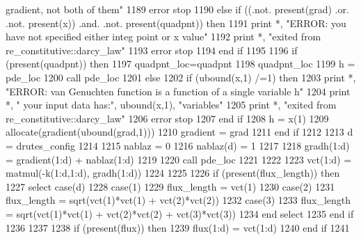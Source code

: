 \begin{DoxyCode}
{       gradient, not both of them"}
1189         error stop
1190       \textcolor{keywordflow}{else} \textcolor{keywordflow}{if} ((.not. \textcolor{keyword}{present}(grad) .or. .not. \textcolor{keyword}{present}(x)) .and. .not. \textcolor{keyword}{present}\textcolor{comment}{(quadpnt)) }\textcolor{keywordflow}{then}
1191         print *, \textcolor{stringliteral}{"ERROR: you have not specified either integ point or x value"}
1192         print *, \textcolor{stringliteral}{"exited from re\_constitutive::darcy\_law"}
1193         error stop
1194 \textcolor{keywordflow}{      end if}
1195       
1196       \textcolor{keywordflow}{if} (\textcolor{keyword}{present}(quadpnt)) \textcolor{keywordflow}{then}
1197         quadpnt\_loc=quadpnt
1198         quadpnt\_loc%
1199         h = pde\_loc%
1200         \textcolor{keyword}{call }pde\_loc%
1201       \textcolor{keywordflow}{else}
1202         \textcolor{keywordflow}{if} (ubound(x,1) /=1) \textcolor{keywordflow}{then}
1203           print *, \textcolor{stringliteral}{"ERROR: van Genuchten function is a function of a single variable h"}
1204           print *, \textcolor{stringliteral}{"       your input data has:"}, ubound(x,1), \textcolor{stringliteral}{"variables"}
1205           print *, \textcolor{stringliteral}{"exited from re\_constitutive::darcy\_law"}
1206           error stop
1207 \textcolor{keywordflow}{        end if}
1208         h = x(1)
1209         \textcolor{keyword}{allocate}(gradient(ubound(grad,1)))
1210         gradient = grad
1211 \textcolor{keywordflow}{      end if}
1212       
1213       d = drutes_config%
1214 
1215       nablaz = 0
1216       nablaz(d) = 1
1217       
1218       gradh(1:d) = gradient(1:d) + nablaz(1:d)
1219 
1220       \textcolor{keyword}{call }pde\_loc%
1221 \textcolor{comment}{     }
1222 \textcolor{comment}{      }
1223 \textcolor{comment}{      vct(1:d) = matmul(-k(1:d,1:d), gradh(1:d))}
1224 \textcolor{comment}{}
1225 \textcolor{comment}{}
1226 \textcolor{comment}{      }\textcolor{keywordflow}{if} (\textcolor{keyword}{present}(flux\_length)) \textcolor{keywordflow}{then}
1227         \textcolor{keywordflow}{select case}(d)
1228           \textcolor{keywordflow}{case}(1)
1229                 flux\_length = vct(1)
1230           \textcolor{keywordflow}{case}(2)
1231                 flux\_length = sqrt(vct(1)*vct(1) + vct(2)*vct(2))
1232           \textcolor{keywordflow}{case}(3)
1233                 flux\_length = sqrt(vct(1)*vct(1) + vct(2)*vct(2) + vct(3\textcolor{comment}{)*vct(3))}
1234 \textcolor{comment}{}\textcolor{keywordflow}{        end select}
1235 \textcolor{keywordflow}{      end if}
1236 
1237 
1238       \textcolor{keywordflow}{if} (\textcolor{keyword}{present}(flux)) \textcolor{keywordflow}{then}
1239         flux(1:d) = vct(1:d)
1240 \textcolor{keywordflow}{      end if}
1241 
\end{DoxyCode}


